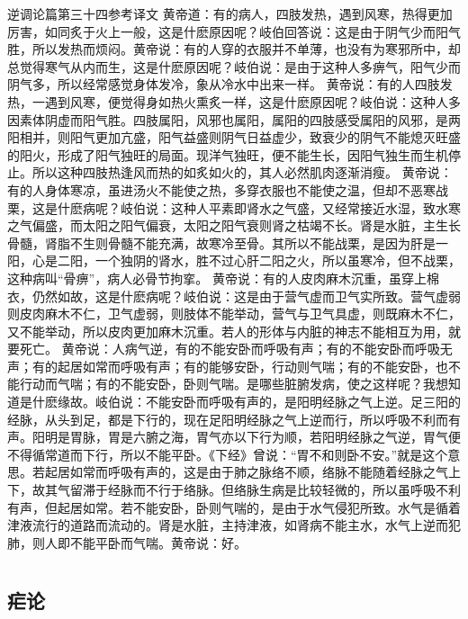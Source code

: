 \documentclass[12pt,UTF8]{ctexbook}
\begin{document}
逆调论篇第三十四参考译文
黄帝道：有的病人，四肢发热，遇到风寒，热得更加厉害，如同炙于火上一般，这是什麽原因呢？岐伯回答说：这是由于阴气少而阳气胜，所以发热而烦闷。黄帝说：有的人穿的衣服并不单薄，也没有为寒邪所中，却总觉得寒气从内而生，这是什麽原因呢？岐伯说：是由于这种人多痹气，阳气少而阴气多，所以经常感觉身体发冷，象从冷水中出来一样。
黄帝说：有的人四肢发热，一遇到风寒，便觉得身如热火熏炙一样，这是什麽原因呢？岐伯说：这种人多因素体阴虚而阳气胜。四肢属阳，风邪也属阳，属阳的四肢感受属阳的风邪，是两阳相并，则阳气更加亢盛，阳气益盛则阴气日益虚少，致衰少的阴气不能熄灭旺盛的阳火，形成了阳气独旺的局面。现洋气独旺，便不能生长，因阳气独生而生机停止。所以这种四肢热逢风而热的如炙如火的，其人必然肌肉逐渐消瘦。
黄帝说：有的人身体寒凉，虽进汤火不能使之热，多穿衣服也不能使之温，但却不恶寒战栗，这是什麽病呢？岐伯说：这种人平素即肾水之气盛，又经常接近水湿，致水寒之气偏盛，而太阳之阳气偏衰，太阳之阳气衰则肾之枯竭不长。肾是水脏，主生长骨髓，肾脂不生则骨髓不能充满，故寒冷至骨。其所以不能战栗，是因为肝是一阳，心是二阳，一个独阴的肾水，胜不过心肝二阳之火，所以虽寒冷，但不战栗，这种病叫“骨痹”，病人必骨节拘挛。
黄帝说：有的人皮肉麻木沉重，虽穿上棉衣，仍然如故，这是什麽病呢？岐伯说：这是由于营气虚而卫气实所致。营气虚弱则皮肉麻木不仁，卫气虚弱，则肢体不能举动，营气与卫气具虚，则既麻木不仁，又不能举动，所以皮肉更加麻木沉重。若人的形体与内脏的神志不能相互为用，就要死亡。
黄帝说：人病气逆，有的不能安卧而呼吸有声；有的不能安卧而呼吸无声；有的起居如常而呼吸有声；有的能够安卧，行动则气喘；有的不能安卧，也不能行动而气喘；有的不能安卧，卧则气喘。是哪些脏腑发病，使之这样呢？我想知道是什麽缘故。岐伯说：不能安卧而呼吸有声的，是阳明经脉之气上逆。足三阳的经脉，从头到足，都是下行的，现在足阳明经脉之气上逆而行，所以呼吸不利而有声。阳明是胃脉，胃是六腑之海，胃气亦以下行为顺，若阳明经脉之气逆，胃气便不得循常道而下行，所以不能平卧。《下经》曾说：“胃不和则卧不安。”就是这个意思。若起居如常而呼吸有声的，这是由于肺之脉络不顺，络脉不能随着经脉之气上下，故其气留滞于经脉而不行于络脉。但络脉生病是比较轻微的，所以虽呼吸不利有声，但起居如常。若不能安卧，卧则气喘的，是由于水气侵犯所致。水气是循着津液流行的道路而流动的。肾是水脏，主持津液，如肾病不能主水，水气上逆而犯肺，则人即不能平卧而气喘。黄帝说：好。

\part{}

\chapter{疟论}
\end{document}
